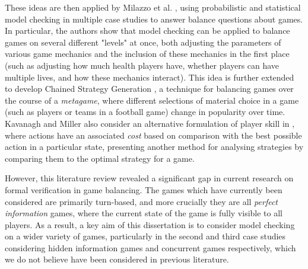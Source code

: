 These ideas are then applied by Milazzo et al. \cite{milazzo_case_2015}, using probabilistic and statistical model checking in multiple case studies to answer balance questions about games. In particular, the authors show that model checking can be applied to balance games on several different "levels" at once, both adjusting the parameters of various game mechanics and the inclusion of these mechanics in the first place (such as adjusting how much health players have, whether players can have multiple lives, and how these mechanics interact). This idea is further extended to develop Chained Strategy Generation \cite{kavanagh_balancing_2019}, a technique for balancing games over the course of a \emph{metagame}, where different selections of material choice in a game (such as players or teams in a football game) change in popularity over time. Kavanagh and Miller also consider an alternative formulation of player skill in \cite{kavanagh_gameplay_2020}, where actions have an associated \emph{cost} based on comparison with the best possible action in a particular state, presenting another method for analysing strategies by comparing them to the optimal strategy for a game.

However, this literature review revealed a significant gap in current research on formal verification in game balancing. The games which have currently been considered are primarily turn-based, and more crucially they are all \emph{perfect information} games, where the current state of the game is fully visible to all players. As a result, a key aim of this dissertation is to consider model checking on a wider variety of games, particularly in the second and third case studies considering hidden information games and concurrent games respectively, which we do not believe have been considered in previous literature.
